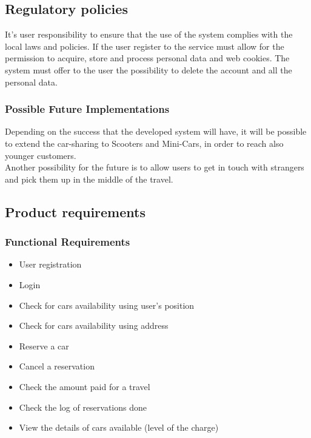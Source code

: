 \documentclass[english]{article}
\newcounter{requirement}
\begin{document}
\subsection{Regulatory policies}
It’s user responsibility to ensure that the use of the system complies with the local laws and policies. If the user register to the service must allow for the permission to acquire, store and process personal data and web cookies. The system must offer to the user the possibility to delete the account and all the personal data.


\subsubsection{Possible Future Implementations}
Depending on the success that the developed system will have, it will be possible to extend the car-sharing to Scooters and Mini-Cars, in order to reach also younger customers.
\\ \noindent 
Another possibility for the future is to allow users to get in touch with strangers and pick them up in the middle of the travel.
\pagebreak{}

\subsection{Product requirements}
\subsubsection{Functional Requirements}

\begin{itemize}
	\item User registration
	\item Login
	\item Check for cars availability using user's position
	\item Check for cars availability using address
	\item Reserve a car
	\item Cancel a reservation
	\item Check the amount paid for a travel
	\item Check the log of reservations done
	\item View the details of cars available (level of the charge)
	
	
\end{itemize}
\end{document}

